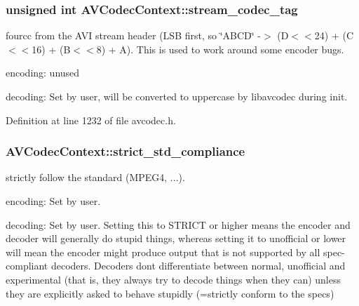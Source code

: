 \subsubsection[{\texorpdfstring{stream\+\_\+codec\+\_\+tag}{stream_codec_tag}}]{\setlength{\rightskip}{0pt plus 5cm}unsigned {\bf int} A\+V\+Codec\+Context\+::stream\+\_\+codec\+\_\+tag}\hypertarget{struct_a_v_codec_context_ae008a28c9ab5820840bd67982019e98d}{}\label{struct_a_v_codec_context_ae008a28c9ab5820840bd67982019e98d}
fourcc from the A\+VI stream header (L\+SB first, so \char`\"{}\+A\+B\+C\+D\char`\"{} -\/$>$ (\textquotesingle{}D\textquotesingle{}$<$$<$24) + (\textquotesingle{}C\textquotesingle{}$<$$<$16) + (\textquotesingle{}B\textquotesingle{}$<$$<$8) + \textquotesingle{}A\textquotesingle{}). This is used to work around some encoder bugs.
\begin{DoxyItemize}
\item encoding\+: unused
\item decoding\+: Set by user, will be converted to uppercase by libavcodec during init. 
\end{DoxyItemize}

Definition at line 1232 of file avcodec.\+h.

\subsubsection[{\texorpdfstring{strict\+\_\+std\+\_\+compliance}{strict_std_compliance}}]{ A\+V\+Codec\+Context\+::strict\+\_\+std\+\_\+compliance}\hypertarget{struct_a_v_codec_context_a3090804569341ca235e3adbdc03318d2}{}\label{struct_a_v_codec_context_a3090804569341ca235e3adbdc03318d2}
strictly follow the standard (M\+P\+E\+G4, ...).
\begin{DoxyItemize}
\item encoding\+: Set by user.
\item decoding\+: Set by user. Setting this to S\+T\+R\+I\+CT or higher means the encoder and decoder will generally do stupid things, whereas setting it to unofficial or lower will mean the encoder might produce output that is not supported by all spec-\/compliant decoders. Decoders don\textquotesingle{}t differentiate between normal, unofficial and experimental (that is, they always try to decode things when they can) unless they are explicitly asked to behave stupidly (=strictly conform to the specs) 
\end{DoxyItemize}

